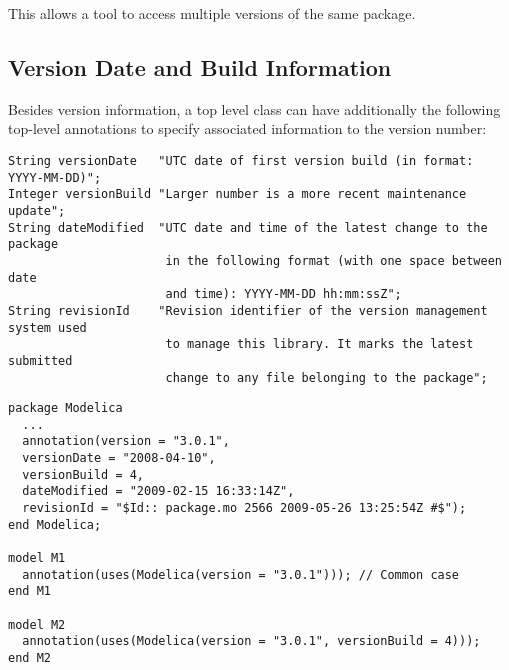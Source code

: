 This allows a tool to access multiple versions of the same package.

\subsection{Version Date and Build Information}\label{version-date-and-build-information}

Besides version information, a top level class can have additionally the following top-level annotations to specify associated information to the version number:%
\begin{lstlisting}[language=modelica]
String versionDate   "UTC date of first version build (in format: YYYY-MM-DD)";
Integer versionBuild "Larger number is a more recent maintenance update";
String dateModified  "UTC date and time of the latest change to the package
                      in the following format (with one space between date
                      and time): YYYY-MM-DD hh:mm:ssZ";
String revisionId    "Revision identifier of the version management system used
                      to manage this library. It marks the latest submitted
                      change to any file belonging to the package";
\end{lstlisting}%

\begin{example}
\begin{lstlisting}[language=modelica,mathescape=false]
package Modelica
  ...
  annotation(version = "3.0.1",
  versionDate = "2008-04-10",
  versionBuild = 4,
  dateModified = "2009-02-15 16:33:14Z",
  revisionId = "$Id:: package.mo 2566 2009-05-26 13:25:54Z #$");
end Modelica;

model M1
  annotation(uses(Modelica(version = "3.0.1"))); // Common case
end M1

model M2
  annotation(uses(Modelica(version = "3.0.1", versionBuild = 4)));
end M2
\end{lstlisting}
\end{example}

